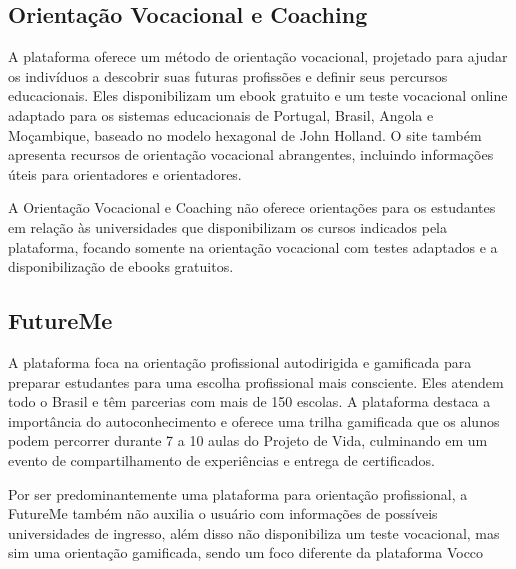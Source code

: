 \subsection{Orientação Vocacional e Coaching}
A plataforma oferece um método de orientação vocacional, projetado para ajudar os indivíduos a descobrir suas futuras profissões e definir seus percursos educacionais. Eles disponibilizam um ebook gratuito e um teste vocacional online adaptado para os sistemas educacionais de Portugal, Brasil, Angola e Moçambique, baseado no modelo hexagonal de John Holland. O site também apresenta recursos de orientação vocacional abrangentes, incluindo informações úteis para orientadores e orientadores​​.

A Orientação Vocacional e Coaching não oferece orientações para os estudantes em relação às universidades que disponibilizam os cursos indicados pela plataforma, focando somente na orientação vocacional com testes adaptados e a disponibilização de ebooks gratuitos.


\subsection{FutureMe}
A plataforma foca na orientação profissional autodirigida e gamificada para preparar estudantes para uma escolha profissional mais consciente. Eles atendem todo o Brasil e têm parcerias com mais de 150 escolas. A plataforma destaca a importância do autoconhecimento e oferece uma trilha gamificada que os alunos podem percorrer durante 7 a 10 aulas do Projeto de Vida, culminando em um evento de compartilhamento de experiências e entrega de certificados​​.

Por ser predominantemente uma plataforma para orientação profissional, a FutureMe também não auxilia o usuário com informações de possíveis universidades de ingresso, além disso  não disponibiliza um teste vocacional, mas sim uma orientação gamificada, sendo um foco diferente da plataforma Vocco 




